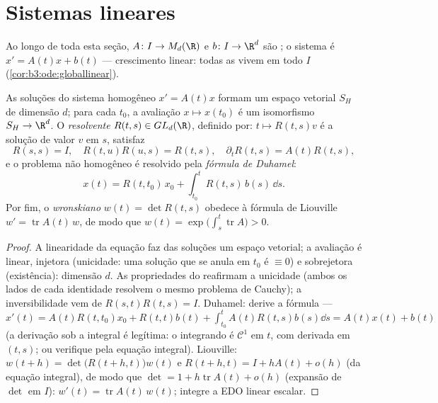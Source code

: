 \section{Sistemas lineares}

Ao longo de toda esta seção, $A \colon I \to M_d(\R)$ e $b
\colon I \to \R^d$ são ; o sistema é
$x' = A(t)x
+ b(t)$ --- crescimento linear: todas as  vivem em todo
$I$ (\cref{cor:b3:ode:globallinear}).

\begin{theorem}[Estrutura]\label{thm:b3:ode:linearstructure}
As soluções do sistema homogêneo $x' = A(t)x$ formam um espaço vetorial
$S_H$ de dimensão $d$; para cada $t_0$, a avaliação $x \mapsto x(t_0)$ é
um isomorfismo $S_H \to
\R^d$. O \emph{resolvente} $R(t, s) \in GL_d(\R)$, definido por: $t \mapsto R(t,
s)v$ é a solução de valor $v$ em
$s$, satisfaz
\[
R(s,s) = I,\quad R(t, u)R(u, s) = R(t, s),\quad
\partial_tR(t,s) = A(t)R(t,s),
\]
e o problema não homogêneo é resolvido pela \emph{fórmula de
Duhamel}:
\[
x(t) = R(t, t_0)\,x_0 + \int_{t_0}^{t}R(t, s)\,b(s)\,\dd s .
\]
Por fim, o \emph{wronskiano} $w(t) = \det
R(t, s)$ obedece à fórmula
de Liouville $w' =
\operatorname{tr}A(t)\,w$, de modo que $w(t) =
\exp\bigl(\int_s^t\operatorname{tr}A\bigr) > 0$.
\end{theorem}

\begin{proof}
A linearidade da equação faz das soluções um espaço vetorial; a
avaliação é linear, injetora (unicidade: uma solução que se anula em
$t_0$ é $\equiv 0$) e sobrejetora (existência): dimensão $d$. As
propriedades do  reafirmam a unicidade (ambos os lados de cada
identidade resolvem o mesmo problema de Cauchy); a inversibilidade vem
de $R(s,t)R(t,s) = I$. Duhamel: derive a fórmula --- $x'(t) = A(t)R(t,t_0)x_0 + R(t,t)b(t) +
\int_{t_0}^tA(t)R(t,s)b(s)\dd s = A(t)x(t) + b(t)$ (a derivação sob a
integral é legítima: o integrando é $\mathcal C^1$ em $t$, com derivada
 em $(t,s)$; ou verifique pela equação integral). Liouville:
$w(t + h) = \det\bigl(R(t+h, t)\bigr)w(t)$ e $R(t + h, t) =
I + hA(t) + o(h)$ (da equação integral), de modo que $\det = 1
+ h\operatorname{tr}A(t) + o(h)$ (expansão de
$\det$ em $I$): $w'(t) = \operatorname{tr}A(t)\,w(t)$; integre a EDO linear escalar.
\end{proof}

